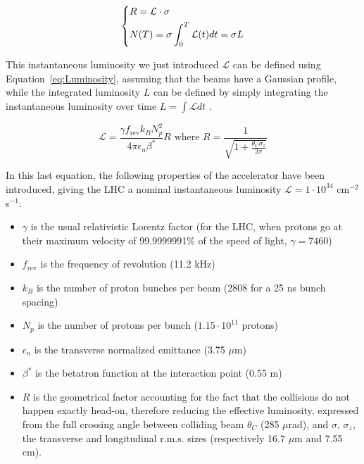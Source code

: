 \documentclass[a4paper, 10pt, openright]{report}
\begin{document}
\begin{equation}
\label{eq:Rate}
\begin{dcases}
R = \mathcal{L} \cdot \sigma \\
N(T) = \sigma \int_0^T \mathcal{L}(t) dt = \sigma L
\end{dcases}
\end{equation}

This instantaneous luminosity we just introduced $\mathcal{L}$ can be defined using Equation~\ref{eq:Luminosity}, assuming that the beams have a Gaussian profile, while the integrated luminosity $L$ can be defined by simply integrating the instantaneous luminosity over time $L = \int \mathcal{L}dt$ \cite{Thomson}.

\begin{equation}
\label{eq:Luminosity}
\mathcal{L} = \frac{\gamma f_{\text{rev}} k_B N_p^2}{4 \pi \epsilon_n \beta^*}R \text{  where } R = \frac{1}{\sqrt{1+\frac{\theta_C \sigma_z}{2 \sigma}}}
\end{equation}

In this last equation, the following properties of the accelerator have been introduced, giving the \ac{LHC} a nominal instantaneous luminosity $\mathcal{L} = 1 \cdot 10^{34}$ cm$^{-2}$ s$^{-1}$:
\begin{itemize}
\item $\gamma$ is the usual relativistic Lorentz factor (for the \ac{LHC}, when protons go at their maximum velocity of 99.9999991\% of the speed of light, $\gamma = 7460$)
\item $f_{\text{rev}}$ is the frequency of revolution (11.2 kHz)
\item $k_B$ is the number of proton bunches per beam (2808 for a 25 ns bunch spacing)
\item $N_p$ is the number of protons per bunch ($1.15 \cdot 10^{11}$ protons)
\item $\epsilon_n$ is the transverse normalized emittance (3.75 $\mu$m)
\item $\beta^*$ is the betatron function at the interaction point (0.55 m)
\item $R$ is the geometrical factor accounting for the fact that the collisions do not happen exactly head-on, therefore reducing the effective luminosity, expressed from the full crossing angle between colliding beam $\theta_C$ (285 $\mu$rad), and $\sigma$, $\sigma_z$, the transverse and longitudinal r.m.s. sizes (respectively 16.7 $\mu$m and 7.55 cm).
\end{itemize}
\end{document}
